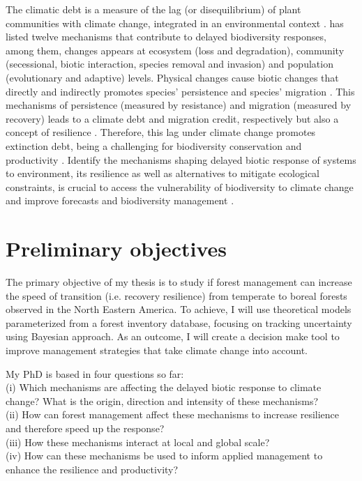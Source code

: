 The climatic debt is a measure of the lag (or disequilibrium) of plant communities with climate change, integrated in an environmental context \citep{Bertrand2016}.
\citet{Essl2015} has listed twelve mechanisms that contribute to delayed biodiversity responses, among them, changes appears at ecosystem (loss and degradation), community (secessional, biotic interaction, species removal and invasion) and population (evolutionary and adaptive) levels.
Physical changes cause biotic changes that directly and indirectly promotes species' persistence and species' migration \citep{Bertrand2016}.
This mechanisms of persistence (measured by resistance) and migration (measured by recovery) leads to a climate debt and migration credit, respectively \citep{Bertrand2016} but also a concept of resilience \citep[see section \ref{res}]{Oliver2015}.
Therefore, this lag under climate change promotes extinction debt, being a challenging for biodiversity conservation \citep{Kuussaari2009} and productivity \citep{Lasch2002}.
Identify the mechanisms shaping delayed biotic response of systems to environment, its resilience as well as alternatives to mitigate ecological constraints, is crucial to access the vulnerability of biodiversity to climate change and improve forecasts and biodiversity management \citep{Essl2015,Oliver2015,Bertrand2016}.

\section{Preliminary objectives}

The primary objective of my thesis is to study if forest management can increase the speed of transition (i.e. recovery resilience) from temperate to boreal forests observed in the North Eastern America.
To achieve, I will use theoretical models parameterized from a forest inventory database, focusing on tracking uncertainty using Bayesian approach.
As an outcome, I will create a decision make tool to improve management strategies that take climate change into account.

My PhD is based in four questions so far: \\
(i) Which mechanisms are affecting the delayed biotic response to climate change? What is the origin, direction and intensity of these mechanisms? \\
(ii) How can forest management affect these mechanisms to increase resilience and therefore speed up the response? \\
(iii) How these mechanisms interact at local and global scale? \\
(iv) How can these mechanisms be used to inform applied management to enhance the resilience and productivity?

